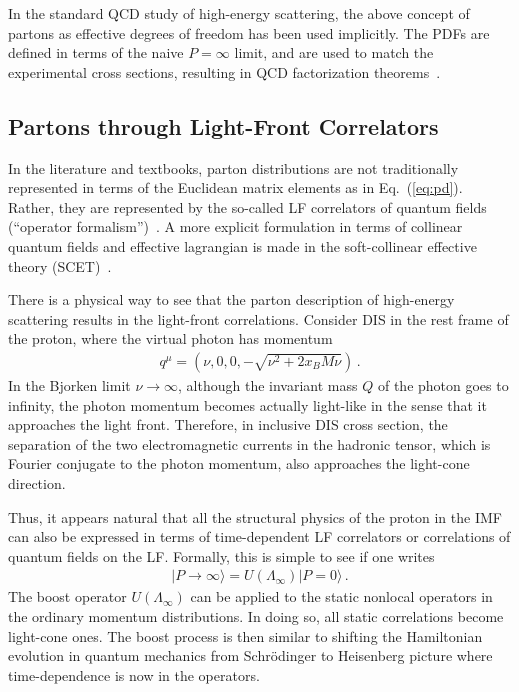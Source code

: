 \documentclass[aps,rmp,reprint,amsmath,amssymb,graphicx,longbibliography]{revtex4-1} %
\DeclareRobustCommand{\eq}[1]{Eq.~(\ref{eq:#1})}
\begin{document}
In the standard QCD study of high-energy scattering,
the above concept of partons as effective degrees of freedom
has been used implicitly. The PDFs are defined in terms of the
naive $P=\infty$ limit, and are used to match the experimental cross sections,
resulting in QCD factorization theorems~\cite{Collins:2011zzd}.

\subsection{Partons through Light-Front Correlators}
\label{sec:lc-imf}

In the literature and textbooks, parton distributions are not traditionally represented
in terms of the Euclidean matrix elements as in \eq{pd}.
Rather, they are represented by the so-called LF correlators of
quantum fields (``operator formalism'')~\cite{Brodsky:1997de,Collins:2011zzd}.
A more explicit formulation in terms of collinear quantum fields
and effective lagrangian is made in the soft-collinear effective theory (SCET)~\cite{Bauer:2000yr,Bauer:2001ct,Bauer:2001yt}.

There is a physical way to see that the parton description of high-energy scattering
results in the light-front correlations. Consider DIS in the rest
frame of the proton, where the virtual photon has momentum
\begin{align}
	q^\mu = (\nu, 0, 0,  -\sqrt{\nu^2+2x_B M\nu}) \,.
\end{align}
In the Bjorken limit $\nu\to\infty$, although the invariant mass $Q$ of the photon
goes to infinity, the photon momentum becomes actually light-like
in the sense that it approaches the light front.
Therefore, in inclusive DIS cross section, the separation of the two electromagnetic currents in the hadronic tensor, which is Fourier conjugate to the photon momentum, also approaches the light-cone direction.

Thus, it appears natural that
all the structural physics of the proton in the IMF can also be
expressed in terms of time-dependent LF correlators or
correlations of quantum fields on the LF. Formally, this is simple to see
if one writes
\begin{align}
	|P\to\infty\rangle = U(\Lambda_\infty) |P=0\rangle \,.
\end{align}
The boost operator $U(\Lambda_\infty)$ can be applied to
the static nonlocal operators in the ordinary momentum distributions.
In doing so, all static correlations become light-cone ones.
The boost process is then similar to shifting the Hamiltonian evolution
in quantum mechanics from Schr\"odinger to Heisenberg
picture where time-dependence is now in the operators.
\end{document}
